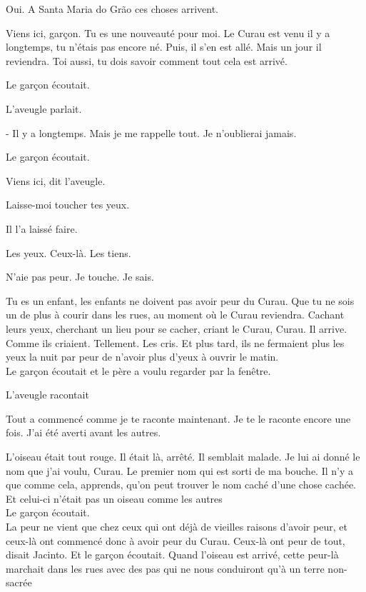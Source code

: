 Oui. A Santa Maria do Grão ces choses arrivent.

Viens ici, garçon. Tu es une nouveauté pour moi. Le Curau est venu il y
a longtemps, tu n'étais pas encore né. Puis, il s'en est allé. Mais un
jour il reviendra. Toi aussi, tu dois savoir comment tout cela est
arrivé.

Le garçon écoutait.

L'aveugle parlait.

- Il y a longtemps. Mais je me rappelle tout. Je n'oublierai jamais.

Le garçon écoutait.

Viens ici, dit l'aveugle.

Laisse-moi toucher tes yeux.

Il l'a laissé faire.

Les yeux. Ceux-là. Les tiens.

N'aie pas peur. Je touche. Je sais.

Tu es un enfant, les enfants ne doivent pas avoir peur du Curau. Que tu
ne sois un de plus à courir dans les rues, au moment où le Curau
reviendra. Cachant leurs yeux, cherchant un lieu pour se cacher, criant
le Curau, Curau. Il arrive. Comme ils criaient. Tellement. Les cris. Et
plus tard, ils ne fermaient plus les yeux la nuit par peur de n'avoir
plus d'yeux à ouvrir le matin.\\

Le garçon écoutait et le père a voulu regarder par la fenêtre.

L'aveugle racontait

Tout a commencé comme je te raconte maintenant. Je te le raconte encore
une fois. J'ai été averti avant les autres.

L'oiseau était tout rouge. Il était là, arrêté. Il semblait malade. Je
lui ai donné le nom que j'ai voulu, Curau. Le premier nom qui est sorti
de ma bouche. Il n'y a que comme cela, apprends, qu'on peut trouver le
nom caché d'une chose cachée. Et celui-ci n'était pas un oiseau comme
les autres\\

Le garçon écoutait.\\

La peur ne vient que chez ceux qui ont déjà de vieilles raisons d'avoir
peur, et ceux-là ont commencé donc à avoir peur du Curau. Ceux-là ont
peur de tout, disait Jacinto. Et le garçon écoutait. Quand l'oiseau est
arrivé, cette peur-là marchait dans les rues avec des pas qui ne nous
conduiront qu'à un terre non-sacrée

